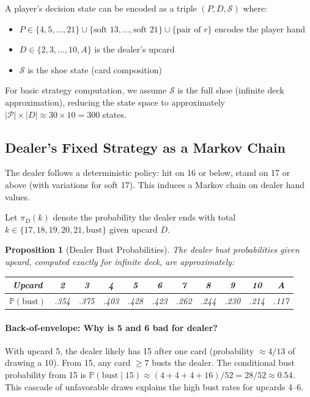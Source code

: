\documentclass[11pt,a4paper]{article}
\newtheorem{proposition}[theorem]{Proposition}
\theoremstyle{definition}
\newcommand{\Prob}{\mathbb{P}}
\begin{document}
A player's decision state can be encoded as a triple $(P, D, \mathcal{S})$ where:
\begin{itemize}[nosep]
\item $P \in \{4, 5, \ldots, 21\} \cup \{\text{soft 13}, \ldots, \text{soft 21}\} \cup \{\text{pair of } r\}$ encodes the player hand
\item $D \in \{2, 3, \ldots, 10, A\}$ is the dealer's upcard
\item $\mathcal{S}$ is the shoe state (card composition)
\end{itemize}

For basic strategy computation, we assume $\mathcal{S}$ is the full shoe (infinite deck approximation), reducing the state space to approximately $|\mathcal{P}| \times |D| \approx 30 \times 10 = 300$ states.

\subsection{Dealer's Fixed Strategy as a Markov Chain}

The dealer follows a deterministic policy: hit on 16 or below, stand on 17 or above (with variations for soft 17). This induces a Markov chain on dealer hand values.

Let $\pi_D(k)$ denote the probability the dealer ends with total $k \in \{17, 18, 19, 20, 21, \text{bust}\}$ given upcard $D$.

\begin{proposition}[Dealer Bust Probabilities]
The dealer bust probabilities given upcard, computed exactly for infinite deck, are approximately:
\begin{center}
\begin{tabular}{c|cccccccccc}
\toprule
Upcard & 2 & 3 & 4 & 5 & 6 & 7 & 8 & 9 & 10 & A \\
\midrule
$\Prob(\text{bust})$ & .354 & .375 & .403 & .428 & .423 & .262 & .244 & .230 & .214 & .117 \\
\bottomrule
\end{tabular}
\end{center}
\end{proposition}

\paragraph{Back-of-envelope: Why is 5 and 6 bad for dealer?} With upcard 5, the dealer likely has 15 after one card (probability $\approx 4/13$ of drawing a 10). From 15, any card $\geq 7$ busts the dealer. The conditional bust probability from 15 is $\Prob(\text{bust} \mid 15) \approx (4+4+4+16)/52 = 28/52 \approx 0.54$. This cascade of unfavorable draws explains the high bust rates for upcards 4--6.
\end{document}
